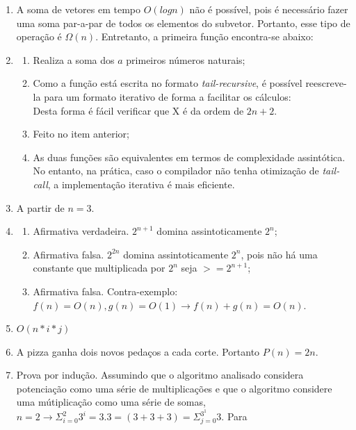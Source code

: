 \documentclass[11pt]{article}
\begin{document}
\begin{enumerate}
    \item A soma de vetores em tempo $O(logn)$ não é possível, pois é necessário fazer uma soma par-a-par de todos os elementos do subvetor. Portanto, esse tipo de operação é $\Omega(n)$. Entretanto, a primeira função encontra-se abaixo: \hfill \\
        
    \item 
        \begin{enumerate}
            \item Realiza a soma dos $a$ primeiros números naturais;
            \item Como a função está escrita no formato \textit{tail-recursive}, é possível reescreve-la para um formato iterativo de forma a facilitar os cálculos: \hfill \\
                
                Desta forma é fácil verificar que X é da ordem de $2n + 2$.
            \item Feito no item anterior;
            \item As duas funções são equivalentes em termos de complexidade
assintótica.  No entanto, na prática, caso o compilador não tenha otimização de
\textit{tail-call}, a implementação iterativa é mais eficiente.
        \end{enumerate}
    \item A partir de $n=3$.
    \item 
        \begin{enumerate}
            \item Afirmativa verdadeira. $2^{n+1}$ domina assintoticamente $2^n$;
            \item Afirmativa falsa. $2^{2n}$ domina assintoticamente $2^n$, pois não há uma constante que multiplicada por $2^{n}$ seja $>=2^{n+1}$;
            \item Afirmativa falsa. Contra-exemplo: $ f(n) = O(n), g(n) = O(1) \rightarrow f(n) + g(n) = O(n)$.
        \end{enumerate}
    \item $O(n*i*j)$
    \item A pizza ganha dois novos pedaços a cada corte. Portanto $P(n) = 2n$.
    \item Prova por indução. Assumindo que o algoritmo analisado considera
potenciação como uma série de multiplicações e que o algoritmo considere uma
mútiplicação como uma série de somas, $n = 2 \rightarrow \Sigma_{i=0}^2 3^i = 3.3 = (3+3+3) = \Sigma_{j=0}^{3^1} 3$. Para 

\end{enumerate}
\end{document}
